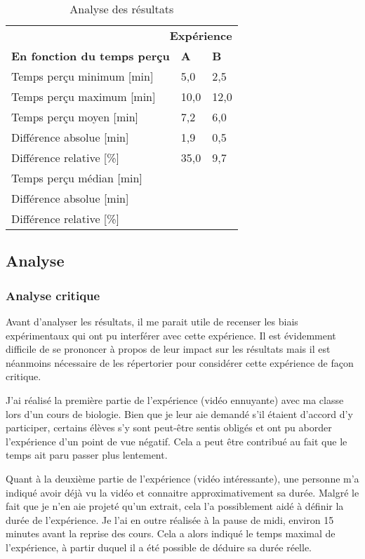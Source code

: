\documentclass[12pt,fleqn,oneside,openany]{book} %
\begin{document}
\begin{table}[h!]
	\centering
	\caption{Analyse des résultats} \label{tbl:analyse1.1}
	\begin{tabular}{lll}
		\toprule
		\multicolumn{3}{r}{\textbf{Expérience}} \\ 
		\textbf{En fonction du temps perçu} & \textbf{A} & \textbf{B} \\ \midrule
		Temps perçu minimum [min] & 5,0 & 2,5 \\ 
		Temps perçu maximum [min] & 10,0 & 12,0 \\
		Temps perçu moyen [min] & 7,2 & 6,0 \\
		Différence absolue [min] & 1,9 & 0,5 \\ 
		Différence relative [\%] & 35,0 & 9,7 \\
		Temps perçu médian [min] &  & \\ 
		Différence absolue [min] &  & \\ 
		Différence relative [\%] &  & \\ \bottomrule
	\end{tabular}
\end{table}
\clearpage 

\subsection{Analyse} \label{ssec:analyse1.1}

\subsubsection{Analyse critique} \label{sssec:analyseCrit1.1}
Avant d'analyser les résultats, il me parait utile de recenser les biais expérimentaux qui ont pu interférer avec cette expérience. Il est évidemment difficile de se prononcer à propos de leur impact sur les résultats mais il est néanmoins nécessaire de les répertorier pour considérer cette expérience de façon critique.

J'ai réalisé la première partie de l'expérience (vidéo ennuyante) avec ma classe lors d'un cours de biologie. Bien que je leur aie demandé s'il étaient d'accord d'y participer, certains élèves s'y sont peut-être sentis obligés et ont pu aborder l'expérience d'un point de vue négatif. Cela a peut être contribué au fait que le temps ait paru passer plus lentement.

Quant à la deuxième partie de l'expérience (vidéo intéressante), une personne m'a indiqué avoir déjà vu la vidéo et connaitre approximativement sa durée. Malgré le fait que je n'en aie projeté qu'un extrait, cela l'a possiblement aidé à définir la durée de l'expérience.
Je l'ai en outre réalisée à la pause de midi, environ 15 minutes avant la reprise des cours. Cela a alors indiqué le temps maximal de l'expérience, à partir duquel il a été possible de déduire sa durée réelle. 
\end{document}
